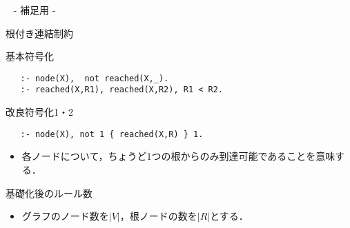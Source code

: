 \appendix
\backupbegin

\begin{frame}{~}
 \centering
 - 補足用 -
\end{frame} 


\begin{frame}[fragile]{根付き連結制約}
\begin{exampleblock}{基本符号化}\small
\begin{lstlisting}
   :- node(X),  not reached(X,_).
   :- reached(X,R1), reached(X,R2), R1 < R2.
\end{lstlisting}
\end{exampleblock}
\begin{exampleblock}{改良符号化1・2}\small
\begin{lstlisting}
   :- node(X), not 1 { reached(X,R) } 1.
\end{lstlisting}
\end{exampleblock}
\vfill
\begin{itemize}
\item 各ノードについて，ちょうど1つの根からのみ到達可能であることを意味する．
\end{itemize}
\end{frame}
\begin{frame}{基礎化後のルール数}
  \begin{itemize}
  \item グラフのノード数を$|V|$，根ノードの数を$|R|$とする．
  \end{itemize}
  \begin{table}[t]
    \centering
    
  \end{table}
\end{frame}
